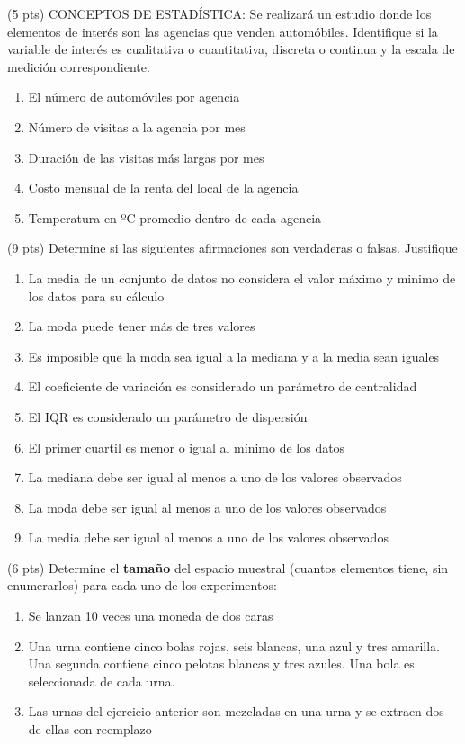 \documentclass[addpoints]{exam}
\theoremstyle{mytheor}
\begin{document}
  \begin{questions}
  
  \question (5 pts) CONCEPTOS DE ESTADÍSTICA: Se realizará un estudio donde los elementos de interés son las agencias que venden automóbiles. Identifique si la variable de interés es cualitativa o cuantitativa, discreta o continua y la escala de medición correspondiente. 
  
  \begin{enumerate}
  \item El número de automóviles por agencia
  \item Número de visitas a la agencia por mes
  \item Duración de las visitas más largas por mes
  \item Costo mensual de la renta del local de la agencia
  \item Temperatura en ºC promedio dentro de cada agencia
  \end{enumerate}
  
  \question (9 pts) Determine si las siguientes afirmaciones son verdaderas o falsas. Justifique
  
  \begin{enumerate}
  \item La media de un conjunto de datos no considera el valor máximo y minimo de los datos para su cálculo
  \item La moda puede tener más de tres valores 
  \item Es imposible que la moda sea igual a la mediana y a la media sean iguales
  \item El coeficiente de variación es considerado un parámetro de centralidad
  \item El IQR es considerado un parámetro de dispersión
  \item El primer cuartil es menor o igual al mínimo de los datos
  \item La mediana debe ser igual al menos a uno de los valores observados
  \item La moda debe ser igual al menos a uno de los valores observados
  \item La media debe ser igual al menos a uno de los valores observados
  \end{enumerate}
  
  \question (6 pts) 
  Determine el \textbf{tamaño} del espacio muestral (cuantos elementos tiene, sin enumerarlos) para cada uno de los experimentos:
  \begin{enumerate}
  \item Se lanzan 10 veces una moneda de dos caras
  \item Una urna contiene cinco bolas rojas, seis blancas, una azul y tres amarilla. Una segunda contiene cinco pelotas blancas y tres azules. Una bola es seleccionada de cada urna. 
  \item Las urnas del ejercicio anterior son mezcladas en una urna y se extraen dos de ellas con reemplazo
  \end{enumerate}
  
\end{questions}
  
\end{document}
